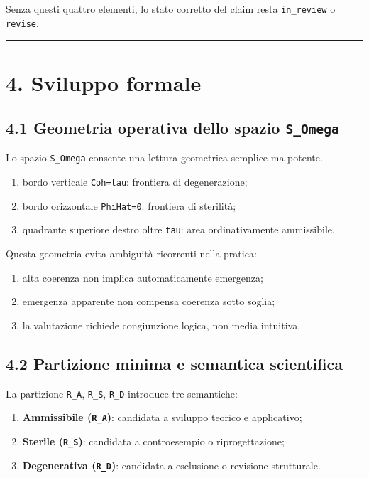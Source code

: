 Senza questi quattro elementi, lo stato corretto del claim resta \texttt{in\_review} o \texttt{revise}.

\begin{center}\rule{0.5\linewidth}{0.5pt}\end{center}

\section{4. Sviluppo formale}

\subsection{\texorpdfstring{4.1 Geometria operativa dello spazio \texttt{S\_Omega}}{4.1 Geometria operativa dello spazio S\_Omega}}

Lo spazio \texttt{S\_Omega} consente una lettura geometrica semplice ma potente.

\begin{enumerate}
\def\labelenumi{\arabic{enumi}.}
\tightlist
\item
  bordo verticale \texttt{Coh=tau}: frontiera di degenerazione;
\item
  bordo orizzontale \texttt{PhiHat=0}: frontiera di sterilità;
\item
  quadrante superiore destro oltre \texttt{tau}: area ordinativamente ammissibile.
\end{enumerate}

Questa geometria evita ambiguità ricorrenti nella pratica:

\begin{enumerate}
\def\labelenumi{\arabic{enumi}.}
\tightlist
\item
  alta coerenza non implica automaticamente emergenza;
\item
  emergenza apparente non compensa coerenza sotto soglia;
\item
  la valutazione richiede congiunzione logica, non media intuitiva.
\end{enumerate}

\subsection{4.2 Partizione minima e semantica scientifica}

La partizione \texttt{R\_A}, \texttt{R\_S}, \texttt{R\_D} introduce tre semantiche:

\begin{enumerate}
\def\labelenumi{\arabic{enumi}.}
\tightlist
\item
  \textbf{Ammissibile (\texttt{R\_A})}: candidata a sviluppo teorico e applicativo;
\item
  \textbf{Sterile (\texttt{R\_S})}: candidata a controesempio o riprogettazione;
\item
  \textbf{Degenerativa (\texttt{R\_D})}: candidata a esclusione o revisione strutturale.
\end{enumerate}

